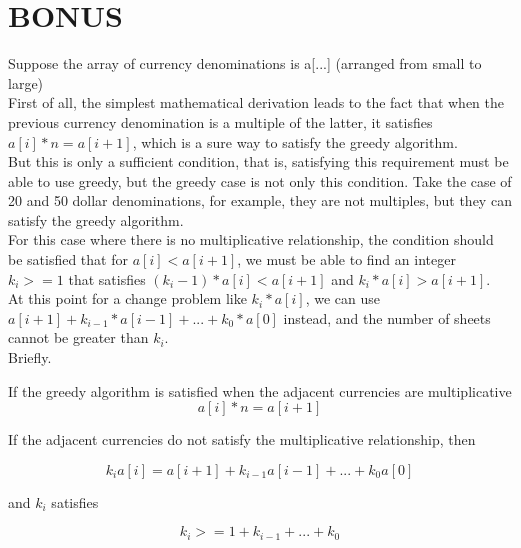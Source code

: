 \documentclass{article}
\begin{document}
\clearpage
\section{BONUS}
Suppose the array of currency denominations is a[...] (arranged from small to large)\\
First of all, the simplest mathematical derivation leads to the fact that when the previous currency denomination is a multiple of the latter, it satisfies $a[i]*n = a[i+1]$, which is a sure way to satisfy the greedy algorithm.\\
But this is only a sufficient condition, that is, satisfying this requirement must be able to use greedy, but the greedy case is not only this condition. Take the case of 20 and 50 dollar denominations, for example, they are not multiples, but they can satisfy the greedy algorithm.\\
For this case where there is no multiplicative relationship, the condition should be satisfied that for $a[i] < a[i+1]$, we must be able to find an integer $k_i>=1$ that satisfies $(k_i-1)*a[i] < a[i+1]$ and $k_i*a[i]>a[i+1]$.\\
At this point for a change problem like $k_i*a[i]$, we can use $a[i+1] + k_{i-1}*a[i-1] + ... + k_0*a[0]$ instead, and the number of sheets cannot be greater than $k_i$.\\

Briefly.

If the greedy algorithm is satisfied when the adjacent currencies are multiplicative
$$
a[i]*n = a[i+1]
$$

If the adjacent currencies do not satisfy the multiplicative relationship, then

$$
k_ia[i] = a[i+1] + k_{i-1}a[i-1] + ... + k_0a[0]
$$

and $k_i$ satisfies

$$
k_i >= 1+ k_{i-1}+... +k_0
$$
\end{document}
